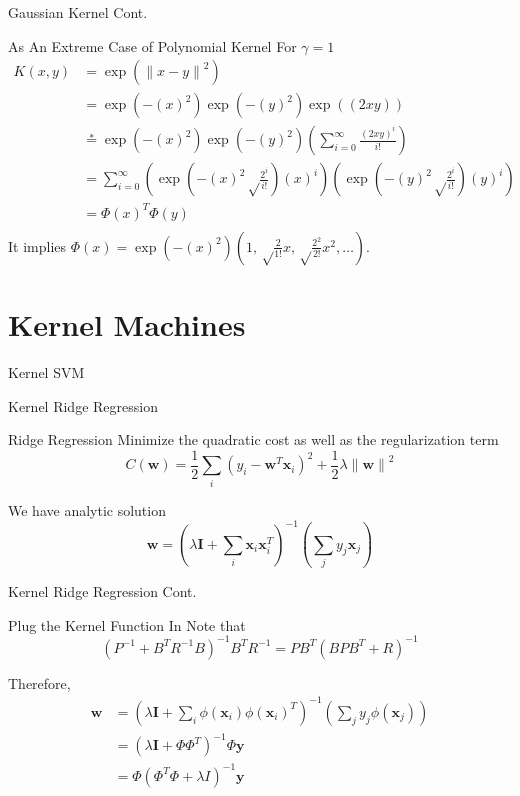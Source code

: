 \documentclass[10pt, compress]{beamer}
\begin{document}
\begin{frame}[fragile]{Gaussian Kernel Cont.}
  \begin{block}{As An Extreme Case of Polynomial Kernel}
    For \(\gamma = 1\)
    \begin{equation}
      \begin{split}
          K(x, y) &= \exp({\| x-y \|}^{2}) \\
                  &= \exp(-{(x)}^{2})\exp(-{(y)}^{2})\exp({(2xy)}) \\
                  &\stackrel{*}{=} \exp(-{(x)}^{2})\exp(-{(y)}^{2})(\sum_{i=0}^{\infty}\frac{{(2xy)}^{i}}{i!}) \\
                  &= \sum_{i=0}^{\infty}(\exp(-{(x)}^{2}\sqrt\frac{2^{i}}{i!}){(x)}^{i})(\exp(-{(y)}^{2}\sqrt\frac{2^{i}}{i!}){(y)}^{i}) \\
                  &= \Phi{(x)}^{T}\Phi(y)\\
      \end{split}
    \end{equation}
    It implies \(\Phi(x) = \exp(-{(x)}^{2})(1, \sqrt\frac{2}{1!}x, \sqrt\frac{2^{2}}{2!}x^{2}, \dots)\).
  \end{block}
\end{frame}

\section{Kernel Machines}

\begin{frame}[fragile]{Kernel SVM}
\end{frame}

\begin{frame}[fragile]{Kernel Ridge Regression}
  \begin{block}{Ridge Regression}
    Minimize the quadratic cost as well as the regularization term
    \[
      C(\mathbf{w}) = \frac{1}{2} \sum_{i} {(y_i - \mathbf{w}^T\mathbf{x}_i)}^2 + \frac{1}{2} \lambda {\| \mathbf{w} \|}^2
    \]

    We have analytic solution
    \[
      \mathbf{w} = {(\lambda \mathbf{I} + \sum_{i} \mathbf{x}_i \mathbf{x}_i^T )}^{-1} (\sum_{j} y_j \mathbf{x}_j)
    \]
  \end{block}
\end{frame}

\begin{frame}[fragile]{Kernel Ridge Regression Cont.}
  \begin{block}{Plug the Kernel Function In}
    Note that
    \[
      {(P^{-1} + B^T R^{-1} B)}^{-1} B^T R^{-1} = PB^T {(BPB^T + R)}^{-1}
    \]

    Therefore,
    \begin{align*}
      \mathbf{w} &= {(\lambda \mathbf{I} + \sum_{i} \phi(\mathbf{x}_i) {\phi(\mathbf{x}_i)}^T )}^{-1} (\sum_{j} y_j \phi(\mathbf{x}_j)) \\
                &= {(\lambda \mathbf{I} + \Phi \Phi^T) }^{-1} \Phi \mathbf{y} \\
                &= \Phi {(\Phi^T \Phi + \lambda I)}^{-1} \mathbf{y}
    \end{align*}
  \end{block}
\end{frame}
\end{document}
